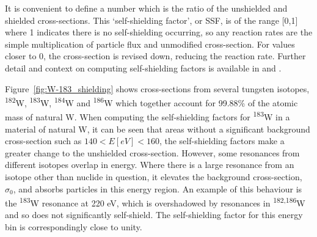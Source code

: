 It is convenient to define a number which is the ratio of the unshielded and shielded cross-sections. This `self-shielding factor', or SSF, is of the range [0,1] where 1 indicates there is no self-shielding occurring, so any reaction rates are the simple multiplication of particle flux and unmodified cross-section. For values closer to 0, the cross-section is revised down, reducing the reaction rate. Further detail and context on computing self-shielding factors is available in \cite{Dembia2013} and \cite{Bell1970}. 

Figure~\ref{fig:W-183_shielding} shows cross-sections from several tungsten isotopes, \textsuperscript{182}W, \textsuperscript{183}W, \textsuperscript{184}W and \textsuperscript{186}W which together account for 99.88\% of the atomic mass of natural W. When computing the self-shielding factors for \textsuperscript{183}W in a material of natural W, it can be seen that areas without a significant background cross-section such as $140 < E [eV] < 160$, the self-shielding factors make a greater change to the unshielded cross-section. However, some resonances from different isotopes overlap in energy. Where there is a large resonance from an isotope other than nuclide in question, it elevates the background cross-section, $\sigma_{0}$, and absorbs particles in this energy region. An example of this behaviour is the \textsuperscript{183}W resonance at 220 eV, which is overshadowed by resonances in \textsuperscript{182,186}W and so does not significantly self-shield. The self-shielding factor for this energy bin is correspondingly close to unity.

